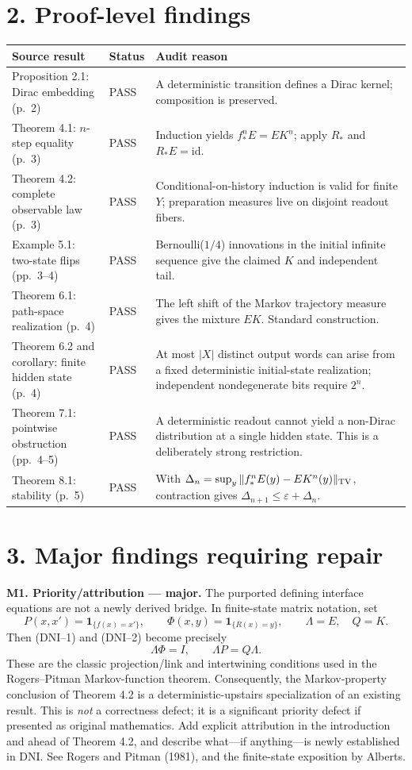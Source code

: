 \documentclass[11pt,letterpaper]{article}
\begin{document}
\section*{2. Proof-level findings}
\small
\renewcommand{\arraystretch}{1.22}
\begin{longtable}{@{}p{.36\linewidth}p{.12\linewidth}p{.46\linewidth}@{}}
\toprule
\textbf{Source result} & \textbf{Status} & \textbf{Audit reason}\tabularnewline\midrule
\endhead
Proposition 2.1: Dirac embedding (p.~2) & PASS & A deterministic transition defines a Dirac kernel; composition is preserved.\\
Theorem 4.1: $n$-step equality (p.~3) & PASS & Induction yields $f_*^n E=E K^n$; apply $R_*$ and $R_*E=\mathrm{id}$.\\
Theorem 4.2: complete observable law (p.~3) & PASS & Conditional-on-history induction is valid for finite $Y$; preparation measures live on disjoint readout fibers.\\
Example 5.1: two-state flips (pp.~3--4) & PASS & Bernoulli($1/4$) innovations in the initial infinite sequence give the claimed $K$ and independent tail.\\
Theorem 6.1: path-space realization (p.~4) & PASS & The left shift of the Markov trajectory measure gives the mixture $E K$. Standard construction.\\
Theorem 6.2 and corollary: finite hidden state (p.~4) & PASS & At most $|X|$ distinct output words can arise from a fixed deterministic initial-state realization; independent nondegenerate bits require $2^n$.\\
Theorem 7.1: pointwise obstruction (pp.~4--5) & PASS & A deterministic readout cannot yield a non-Dirac distribution at a single hidden state. This is a deliberately strong restriction.\\
Theorem 8.1: stability (p.~5) & PASS & With $\Delta_n=\sup_y\|f_*^nE(y)-EK^n(y)\|_{\rm TV}$, contraction gives $\Delta_{n+1}\le\varepsilon+\Delta_n$.\\
\bottomrule
\end{longtable}
\normalsize

\section*{3. Major findings requiring repair}
\textbf{M1. Priority/attribution --- major.}  The purported defining interface equations are not a newly derived bridge. In finite-state matrix notation, set
\[
P(x,x')=\mathbf 1_{\{f(x)=x'\}},\qquad
\Phi(x,y)=\mathbf 1_{\{R(x)=y\}},\qquad \Lambda=E,\quad Q=K.
\]
Then (DNI--1) and (DNI--2) become precisely
\[
\boxed{\Lambda\Phi=I,\qquad \Lambda P=Q\Lambda.}
\]
These are the classic projection/link and intertwining conditions used in the Rogers--Pitman Markov-function theorem. Consequently, the Markov-property conclusion of Theorem 4.2 is a deterministic-upstairs specialization of an existing result. This is \emph{not} a correctness defect; it is a significant priority defect if presented as original mathematics. Add explicit attribution in the introduction and ahead of Theorem 4.2, and describe what---if anything---is newly established in DNI. See Rogers and Pitman (1981), and the finite-state exposition by Alberts.
\end{document}
